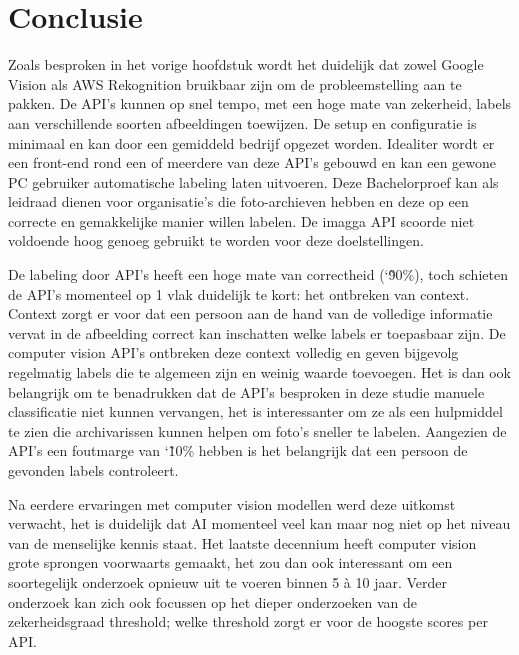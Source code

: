 
\chapter{Conclusie}
\label{ch:conclusie}


Zoals besproken in het vorige hoofdstuk wordt het duidelijk dat zowel Google Vision als AWS Rekognition bruikbaar zijn om de probleemstelling aan te pakken. De API's kunnen op snel tempo, met een hoge mate van zekerheid, labels aan verschillende soorten afbeeldingen toewijzen. De setup en configuratie is minimaal en kan door een gemiddeld bedrijf opgezet worden. Idealiter wordt er een front-end rond een of meerdere van deze API's gebouwd en kan een gewone PC gebruiker automatische labeling laten uitvoeren. Deze Bachelorproef kan als leidraad dienen voor organisatie's die foto-archieven hebben en deze op een correcte en gemakkelijke manier willen labelen. 
De imagga API scoorde niet voldoende hoog genoeg gebruikt te worden voor deze doelstellingen.

De labeling door API's heeft een hoge mate van correctheid (\char`\~ 90\%), toch schieten de API's momenteel op 1 vlak duidelijk te kort: het ontbreken van context. Context zorgt er voor dat een persoon aan de hand van de volledige informatie vervat in de afbeelding correct kan inschatten welke labels er toepasbaar zijn. De computer vision API's ontbreken deze context volledig en geven bijgevolg regelmatig labels die te algemeen zijn en weinig waarde toevoegen. Het is dan ook belangrijk om te benadrukken dat de API's besproken in deze studie manuele classificatie niet kunnen vervangen, het is interessanter om ze als een hulpmiddel te zien die archivarissen kunnen helpen om foto's sneller te labelen. Aangezien de API's een foutmarge van \char`\~ 10\% hebben is het belangrijk dat een persoon de gevonden labels controleert.

Na eerdere ervaringen met computer vision modellen werd deze uitkomst verwacht, het is duidelijk dat AI momenteel veel kan maar nog niet op het niveau van de menselijke kennis staat. Het laatste decennium heeft computer vision grote sprongen voorwaarts gemaakt, het zou dan ook interessant om een soortegelijk onderzoek opnieuw uit te voeren binnen 5 à 10 jaar. Verder onderzoek kan zich ook focussen op het dieper onderzoeken van de zekerheidsgraad threshold; welke threshold zorgt er voor de hoogste scores per API.